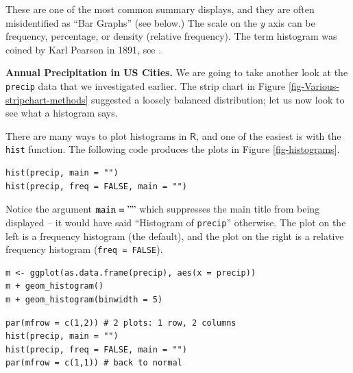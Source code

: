 \documentclass[captions=tableheading]{scrbook}
\begin{document}
These are one of the most common summary displays, and they are often misidentified as ``Bar Graphs'' (see below.) The scale on the \(y\) axis can be frequency, percentage, or density (relative frequency). The term histogram was coined by Karl Pearson in 1891, see \cite{Miller}.

\begin{example}
\textbf{Annual Precipitation in US Cities.} We are going to take another look at the \texttt{precip} data that we investigated earlier. The strip chart in Figure \ref{fig-Various-stripchart-methods} suggested a loosely balanced distribution; let us now look to see what a histogram says. 

There are many ways to plot histograms in \(\mathsf{R}\), and one of the easiest is with the \texttt{hist} function. The following code produces the plots in Figure \ref{fig-histograms}.


\lstset{language=R}
\begin{lstlisting}
hist(precip, main = "")
hist(precip, freq = FALSE, main = "")
\end{lstlisting}

Notice the argument \(\mathtt{main = ""}\) which suppresses the main title from being displayed -- it would have said ``Histogram of \texttt{precip}'' otherwise. The plot on the left is a frequency histogram (the default), and the plot on the right is a relative frequency histogram (\texttt{freq = FALSE}). 


\lstset{language=R}
\begin{lstlisting}
m <- ggplot(as.data.frame(precip), aes(x = precip))
m + geom_histogram()
m + geom_histogram(binwidth = 5)
\end{lstlisting}








\lstset{language=R}
\begin{lstlisting}
par(mfrow = c(1,2)) # 2 plots: 1 row, 2 columns
hist(precip, main = "")
hist(precip, freq = FALSE, main = "")
par(mfrow = c(1,1)) # back to normal
\end{lstlisting}


\end{example}
\end{document}
